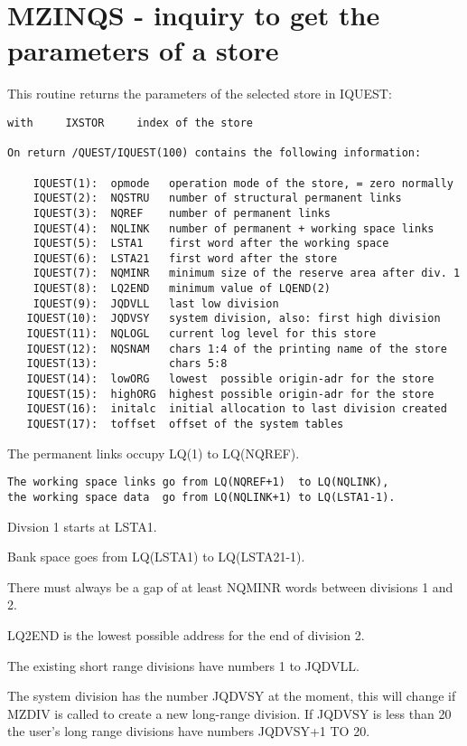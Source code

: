 \section{MZINQS - inquiry to get the parameters of a store}

This routine returns the parameters of the selected store in IQUEST:


\begin{verbatim}
with     IXSTOR     index of the store

On return /QUEST/IQUEST(100) contains the following information:

    IQUEST(1):  opmode   operation mode of the store, = zero normally
    IQUEST(2):  NQSTRU   number of structural permanent links
    IQUEST(3):  NQREF    number of permanent links
    IQUEST(4):  NQLINK   number of permanent + working space links
    IQUEST(5):  LSTA1    first word after the working space
    IQUEST(6):  LSTA21   first word after the store
    IQUEST(7):  NQMINR   minimum size of the reserve area after div. 1
    IQUEST(8):  LQ2END   minimum value of LQEND(2)
    IQUEST(9):  JQDVLL   last low division
   IQUEST(10):  JQDVSY   system division, also: first high division
   IQUEST(11):  NQLOGL   current log level for this store
   IQUEST(12):  NQSNAM   chars 1:4 of the printing name of the store
   IQUEST(13):           chars 5:8
   IQUEST(14):  lowORG   lowest  possible origin-adr for the store
   IQUEST(15):  highORG  highest possible origin-adr for the store
   IQUEST(16):  initalc  initial allocation to last division created
   IQUEST(17):  toffset  offset of the system tables
\end{verbatim} 
The permanent links occupy  LQ(1) to LQ(NQREF).
\begin{verbatim}
The working space links go from LQ(NQREF+1)  to LQ(NQLINK),
the working space data  go from LQ(NQLINK+1) to LQ(LSTA1-1).
\end{verbatim} 
Divsion 1 starts at LSTA1.

Bank space goes from LQ(LSTA1) to LQ(LSTA21-1).

There must always be a gap of at least NQMINR words between divisions 1 and 2.

LQ2END is the lowest possible address for the end of division 2.

The existing short range divisions have numbers 1 to JQDVLL.

The system division has the number JQDVSY at the moment,
this will change if MZDIV is called to create a new long-range division.
If JQDVSY is less than 20 the user's long range divisions have numbers JQDVSY+1 TO 20.

